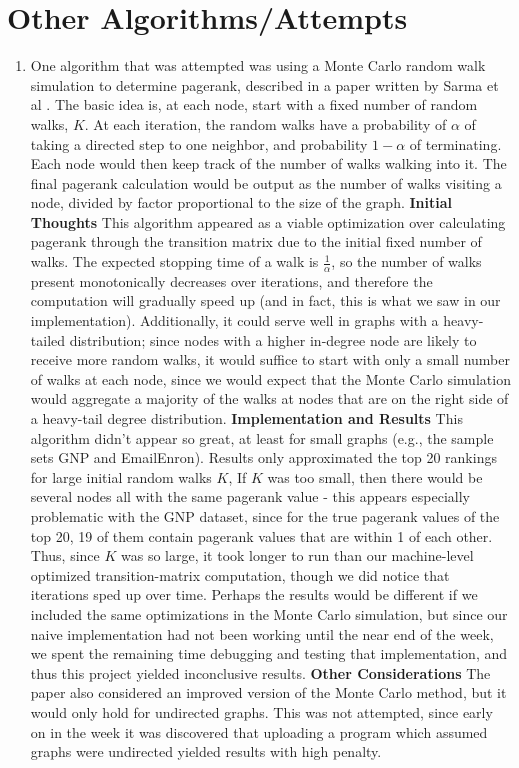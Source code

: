 \section{Other Algorithms/Attempts}
\begin{enumerate}
\item One algorithm that was attempted was using a Monte Carlo random walk simulation
to determine pagerank, described in a paper written by Sarma et al \cite{sarma2013fast}. 
The basic idea is, at each node,
start with a fixed number of random walks, $K$. At each iteration, the random 
walks have a probability of $\alpha$ of taking a directed step to one neighbor,
and probability $1-\alpha$ of terminating. Each node would then keep track of
the number of walks walking into it. The final pagerank calculation would be output
as the number of walks visiting a node, divided by factor proportional
to the size of the graph. 
    \subitem \textbf{Initial Thoughts} This algorithm appeared as a viable optimization
    over calculating pagerank through the transition matrix due to the initial fixed 
    number of walks. The expected stopping time of a walk is $\frac{1}{\alpha}$, so
    the number of walks present monotonically decreases over iterations, and therefore
    the computation will gradually speed up (and in fact, this is what we saw 
    in our implementation). Additionally, it could serve well in graphs with a 
    heavy-tailed distribution; since nodes with a higher in-degree node 
    are likely to receive more random walks, it would suffice to start with only
    a small number of walks at each node, since we would expect that the Monte Carlo
    simulation would aggregate a majority of the walks at nodes that are on the 
    right side of a heavy-tail degree distribution. 
    \subitem \textbf{Implementation and Results} This algorithm didn't appear so great,
    at least for small graphs (e.g., the sample sets GNP and EmailEnron). Results
    only approximated the top 20 rankings for large initial random walks $K$,  
    If $K$ was too small, then there would be several nodes all with the same
    pagerank value - this appears especially problematic with the GNP dataset, 
    since for the true pagerank values of the top 20, 19 of them contain
    pagerank values that are within 1 of each other. Thus, since $K$ was so large,
    it took longer to run than our machine-level optimized transition-matrix computation,
    though we did notice that iterations sped up over time. Perhaps the results would be different if we included
    the same optimizations in the Monte Carlo simulation, but since our naive implementation
    had not been working until the near end of the week, we spent the remaining time
    debugging and testing that implementation, and thus
    this project yielded inconclusive results. 
    \subitem \textbf{Other Considerations} The paper also considered an improved version
    of the Monte Carlo method, but it would only hold for undirected graphs. This was not attempted,
    since early on in the week it was discovered that uploading a program which assumed graphs
    were undirected yielded results with high penalty.
    

\end{enumerate}
